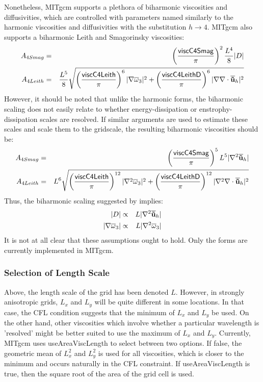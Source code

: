 Nonetheless, MITgcm supports a plethora of biharmonic viscosities
and diffusivities, which are controlled with parameters named
similarly to the harmonic viscosities and diffusivities with the
substitution $h\rightarrow 4$.  MITgcm also supports a biharmonic
Leith and Smagorinsky viscosities:
\begin{eqnarray}
A_{4Smag} & = & 
\left(\frac{{\sf viscC4Smag}}{\pi}\right)^2\frac{L^4}{8}|D| \\
A_{4Leith} & = & 
\frac{L^5}{8}\sqrt{\left(\frac{{\sf viscC4Leith}}{\pi}\right)^6
  |\nabla \BFKav \omega_3|^2
  +\left(\frac{{\sf viscC4LeithD}}{\pi}\right)^6
  |\nabla \nabla\cdot \BFKav {\bf \BFKtu}_h|^2}
\end{eqnarray}
However, it should be noted that unlike the harmonic forms, the
biharmonic scaling does not easily relate to whether
energy-dissipation or enstrophy-dissipation scales are resolved.  If
similar arguments are used to estimate these scales and scale them to
the gridscale, the resulting biharmonic viscosities should be:
\begin{eqnarray}
A_{4Smag} & = & 
\left(\frac{{\sf viscC4Smag}}{\pi}\right)^5L^5
|\nabla^2\BFKav {\bf \BFKtu}_h| \\
A_{4Leith} & = & 
L^6\sqrt{\left(\frac{{\sf viscC4Leith}}{\pi}\right)^{12}
  |\nabla^2 \BFKav \omega_3|^2
  +\left(\frac{{\sf viscC4LeithD}}{\pi}\right)^{12}
  |\nabla^2 \nabla\cdot \BFKav {\bf \BFKtu}_h|^2}
\end{eqnarray}
Thus, the biharmonic scaling suggested by \cite{grha00} implies:
\begin{eqnarray}
|D| & \propto &  L|\nabla^2\BFKav {\bf \BFKtu}_h|\\
|\nabla \BFKav \omega_3| & \propto & L|\nabla^2 \BFKav \omega_3|
\end{eqnarray}
It is not at all clear that these assumptions ought to hold.  Only the
\cite{grha00} forms are currently implemented in MITgcm.

\subsubsection{Selection of Length Scale}
Above, the length scale of the grid has been denoted $L$.  However, in
strongly anisotropic grids, $L_x$ and $L_y$ will be quite different in
some locations.  In that case, the CFL condition suggests that the
minimum of $L_x$ and $L_y$ be used.  On the other hand, other
viscosities which involve whether a particular wavelength is
'resolved' might be better suited to use the maximum of $L_x$ and
$L_y$.  Currently, MITgcm uses {\sf useAreaViscLength} to select
between two options.  If false, the geometric mean of $L^2_x$ and
$L^2_y$ is used for all viscosities, which is closer to the minimum
and occurs naturally in the CFL constraint.  If {\sf
  useAreaViscLength} is true, then the square root of the area of the
grid cell is used.

